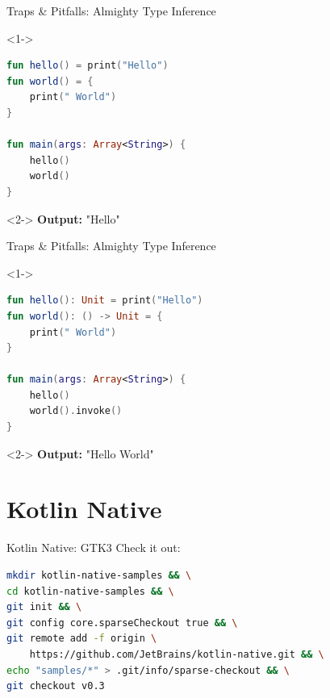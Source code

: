 \begin{frame}[fragile]{Traps \& Pitfalls: Almighty Type Inference}
	\begin{overlayarea}{\textwidth}{.6\textheight}
		\begin{onlyenv}<1->
			\begin{lstlisting}[language=Kotlin]
fun hello() = print("Hello")
fun world() = {
	print(" World")
}

fun main(args: Array<String>) {
	hello()
	world()
}	
			\end{lstlisting}
		\end{onlyenv}
		\begin{onlyenv}<2->
			\textbf{Output:} "Hello"
		\end{onlyenv}
	\end{overlayarea}
\end{frame}

\begin{frame}[fragile]{Traps \& Pitfalls: Almighty Type Inference}
	\begin{overlayarea}{\textwidth}{.6\textheight}
		\begin{onlyenv}<1->
			\begin{lstlisting}[language=Kotlin]
fun hello(): Unit = print("Hello")
fun world(): () -> Unit = {
	print(" World")
}

fun main(args: Array<String>) {
	hello()
	world().invoke()
}
			\end{lstlisting}
		\end{onlyenv}
		\begin{onlyenv}<2->
			\textbf{Output:} "Hello World"
		\end{onlyenv}
	\end{overlayarea}
\end{frame}

\section{Kotlin Native}

\begin{frame}[fragile]{Kotlin Native: GTK3}
	Check it out:\\
	\begin{lstlisting}[language=bash,basicstyle=\ttfamily\small]
mkdir kotlin-native-samples && \
cd kotlin-native-samples && \
git init && \
git config core.sparseCheckout true && \
git remote add -f origin \
	https://github.com/JetBrains/kotlin-native.git && \
echo "samples/*" > .git/info/sparse-checkout && \
git checkout v0.3
	\end{lstlisting}
\end{frame}

